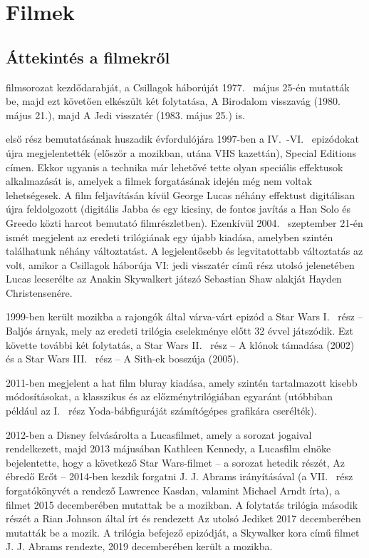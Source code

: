\documentclass[]{thesis-ekf}
\theoremstyle{definition}
\theoremstyle{remark}
\begin{document}
	\chapter{Filmek}\label{fej-filmek}
	\section{Áttekintés a filmekről}
	\Az filmsorozat kezdődarabját, a Csillagok háborúját 1977.~ május 25-én mutatták be, majd ezt követően elkészült két folytatása, A Birodalom visszavág (1980. május 21.), majd A Jedi visszatér (1983. május 25.) is.
	
	\cite{cimke}\Az első rész bemutatásának huszadik évfordulójára 1997-ben a IV.~-VI.~ epizódokat újra megjelentették (először a mozikban, utána VHS kazettán), Special Editions címen. Ekkor ugyanis a technika már lehetővé tette olyan speciális effektusok alkalmazását is, amelyek a filmek forgatásának idején még nem voltak lehetségesek. A film feljavításán kívül George Lucas néhány effektust digitálisan újra feldolgozott (digitális Jabba és egy kicsiny, de fontos javítás a Han Solo és Greedo közti harcot bemutató filmrészletben). Ezenkívül 2004.~ szeptember 21-én ismét megjelent az eredeti trilógiának egy újabb kiadása, amelyben szintén találhatunk néhány változtatást. A legjelentősebb és legvitatottabb változtatás az volt, amikor a Csillagok háborúja VI: \Az jedi visszatér című rész utolsó jelenetében Lucas lecserélte az Anakin Skywalkert játszó Sebastian Shaw alakját Hayden Christensenére.
	
	1999-ben került mozikba a rajongók által várva-várt epizód a Star Wars I.~ rész -- Baljós árnyak, mely az eredeti trilógia cselekménye előtt 32 évvel játszódik. Ezt követte további két folytatás, a Star Wars II.~ rész -- A klónok támadása (2002) és a Star Wars III.~ rész -- A Sith-ek bosszúja (2005).
	
	2011-ben megjelent a hat film bluray kiadása, amely szintén tartalmazott kisebb módosításokat, a klasszikus és az előzménytrilógiában egyaránt (utóbbiban például az I.~ rész Yoda-bábfiguráját számítógépes grafikára cserélték).
	
	2012-ben a Disney felvásárolta a Lucasfilmet, amely a sorozat jogaival rendelkezett, majd 2013 májusában Kathleen Kennedy, a Lucasfilm elnöke bejelentette, hogy a következő Star Wars-filmet -- a sorozat hetedik részét, Az ébredő Erőt -- 2014-ben kezdik forgatni J. J. Abrams irányításával (a VII.~ rész forgatókönyvét a rendező Lawrence Kasdan, valamint Michael Arndt írta), a filmet 2015 decemberében mutattak be a mozikban. A folytatás trilógia második részét a Rian Johnson által írt és rendezett Az utolsó Jediket 2017 decemberében mutatták be a mozik. A trilógia befejező epizódját, a Skywalker kora című filmet J. J. Abrams rendezte, 2019 decemberében került a mozikba.
\end{document}

